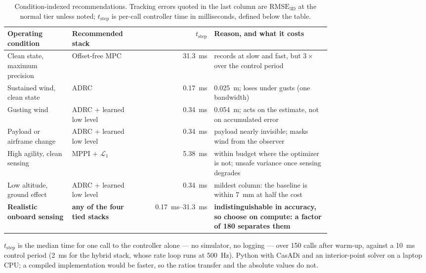 \begin{table}[t]
\caption{Condition-indexed recommendations. Tracking errors quoted in the last column
are $\mathrm{RMSE}_{\mathrm{3D}}$ at the normal tier unless noted;
$t_{\mathrm{step}}$ is per-call controller time in milliseconds, defined below the
table.}
\label{tab:recommend}
\begin{center}\small
\begin{tabular}{@{}p{0.20\linewidth} p{0.20\linewidth} r p{0.36\linewidth}@{}}
\toprule
Operating condition & Recommended stack & $t_{\mathrm{step}}$ & Reason, and what it costs \\
\midrule
Clean state, maximum precision & Offset-free MPC & \SI{31.3}{\milli\second} & records at slow and fast, but $3\times$ over the control period \\
Sustained wind, clean state    & ADRC & \SI{0.17}{\milli\second} & \SI{0.025}{\meter}; loses under gusts (one bandwidth) \\
Gusting wind                   & ADRC + learned low level & \SI{0.34}{\milli\second} & \SI{0.054}{\meter}; acts on the estimate, not on accumulated error \\
Payload or airframe change     & ADRC + learned low level & \SI{0.34}{\milli\second} & payload nearly invisible; masks wind from the observer \\
High agility, clean sensing    & MPPI + $\mathcal{L}_1$ & \SI{5.38}{\milli\second} & within budget where the optimizer is not; unsafe variance once sensing degrades \\
Low altitude, ground effect    & ADRC + learned low level & \SI{0.34}{\milli\second} & mildest column: the baseline is within \SI{7}{\milli\meter} at half the cost \\
\textbf{Realistic onboard sensing} & \textbf{any of the four tied stacks} & \SIrange{0.17}{31.3}{\milli\second} & \textbf{indistinguishable in accuracy, so choose on compute: a factor of 180 separates them} \\
\bottomrule
\end{tabular}
\end{center}
{\footnotesize $t_{\mathrm{step}}$ is the median time for one call to the controller
alone --- no simulator, no logging --- over 150 calls after warm-up, against a
\SI{10}{\milli\second} control period (\SI{2}{\milli\second} for the hybrid stack, whose
rate loop runs at \SI{500}{\hertz}). Python with CasADi and an interior-point solver on
a laptop CPU; a compiled implementation would be faster, so the ratios transfer and the
absolute values do not.\par}
\end{table}
